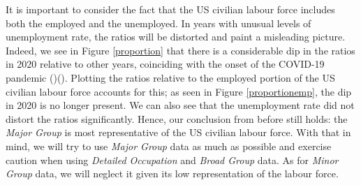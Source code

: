 \documentclass[11pt]{article}
\begin{document}
It is important to consider the fact that the US civilian labour force includes both the employed and the unemployed. In years with unusual levels of unemployment rate, the ratios will be distorted and paint a misleading picture. Indeed, we see in Figure \ref{proportion} that there is a considerable dip in the ratios in 2020 relative to other years, coinciding with the onset of the COVID-19 pandemic (\cite{covid2020unemployment})(\cite{congresscovidunemployment}). Plotting the ratios relative to the employed portion of the US civilian labour force accounts for this; as seen in Figure \ref{proportionemp}, the dip in 2020 is no longer present. We can also see that the unemployment rate did not distort the ratios significantly. Hence, our conclusion from before still holds: the \emph{Major Group} is most representative of the US civilian labour force. With that in mind, we will try to use \emph{Major Group} data as much as possible and exercise caution when using \emph{Detailed Occupation} and \emph{Broad Group} data. As for \emph{Minor Group} data, we will neglect it given its low representation of the labour force.
\end{document}

